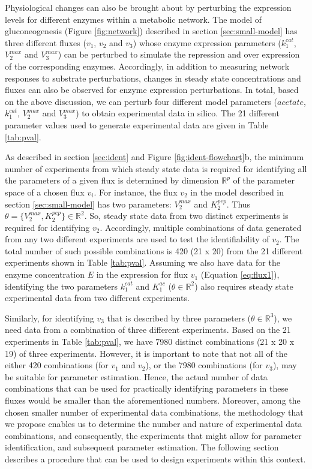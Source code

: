 \documentclass[10pt]{article}
\begin{document}
	Physiological changes can also be brought about by perturbing the expression levels for different enzymes within a metabolic network. The model of gluconeogenesis (Figure \ref{fig:network}) described in section \ref{sec:small-model} has three different fluxes ($v_1$, $v_2$ and $v_3$) whose enzyme expression parameters ($k_1^{cat}$, $V_2^{max}$ and $V_3^{max}$) can be perturbed to simulate the repression and over expression of the corresponding enzymes. Accordingly, in addition to measuring network responses to substrate perturbations, changes in steady state concentrations and fluxes can also be observed for enzyme expression perturbations. In total, based on the above discussion, we can perturb four different model parameters ($acetate$, $k_1^{cat}$, $V_2^{max}$ and $V_3^{max}$) to obtain experimental data in silico. The 21 different parameter values used to generate experimental data are given in Table \ref{tab:pval}.	
	
	As described in section \ref{sec:ident} and Figure \ref{fig:ident-flowchart}b, the minimum number of experiments from which steady state data is required for identifying all the parameters of a given flux is determined by dimension $\mathbb{R}^p$ of the parameter space of a chosen flux $v_i$. For instance, the flux $v_2$ in the model described in section \ref{sec:small-model} has two parameters: $V_2^{max}$ and $K_2^{pep}$. Thus $\theta = \{V_2^{max}, K_2^{pep}\} \in \mathbb{R}^2$. So, steady state data from two distinct experiments is required for identifying $v_2$. Accordingly, multiple combinations of data generated from any two different experiments are used to test the identifiability of $v_2$. The total number of such possible combinations is 420 (21 x 20) from the 21 different experiments shown in Table \ref{tab:pval}. Assuming we also have data for the enzyme concentration $E$ in the expression for flux $v_1$ (Equation \ref{eq:flux1}), identifying the two parameters $k_1^{cat}$ and $K_1^{ac}$ ($\theta \in \mathbb{R}^2$) also requires steady state experimental data from two different experiments.
	
	Similarly, for identifying $v_3$ that is described by three parameters ($\theta \in \mathbb{R}^3$), we need data from a combination of three different experiments. Based on the 21 experiments in Table \ref{tab:pval}, we have 7980 distinct combinations (21 x 20 x 19) of three experiments. However, it is important to note that not all of the either 420 combinations (for $v_1$ and $v_2$), or the 7980 combinations (for $v_3$), may be suitable for parameter estimation. Hence, the actual number of data combinations that can be used for practically identifying parameters in these fluxes would be smaller than the aforementioned numbers. Moreover, among the chosen smaller number of experimental data combinations, the methodology that we propose enables us to determine the number and nature of experimental data combinations, and consequently, the experiments that might allow for parameter identification, and subsequent parameter estimation. The following section describes a procedure that can be used to design experiments within this context.	
	
\end{document}
